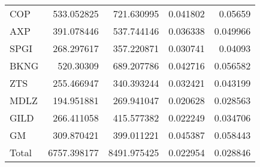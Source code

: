 \documentclass{gji}
\begin{document}
{\begin{tabular}{@{}lrrrr}
  COP &  533.052825 &  721.630995 & 0.041802 &  0.05659 \\
  AXP &  391.078446 &  537.744146 & 0.036338 & 0.049966 \\
 SPGI &  268.297617 &  357.220871 & 0.030741 &  0.04093 \\
 BKNG &   520.30309 &  689.207786 & 0.042716 & 0.056582 \\
  ZTS &  255.466947 &  340.393244 & 0.032421 & 0.043199 \\
 MDLZ &  194.951881 &  269.941047 & 0.020628 & 0.028563 \\
 GILD &  266.411058 &  415.577382 & 0.022249 & 0.034706 \\
   GM &  309.870421 &  399.011221 & 0.045387 & 0.058443 \\
Total & 6757.398177 & 8491.975425 & 0.022954 & 0.028846 \\
\hline
\end{tabular}}
\end{document}
